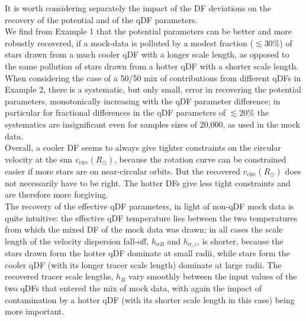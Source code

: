 It is worth considering separately the impact of the DF deviations on the recovery of the potential and of the qDF parameters. 
\\We find from Example 1 that the potential parameters can be better and more robustly recovered, if a mock-data \MAP is polluted by a modest fraction ($\lesssim 30\%$) of stars drawn from a much cooler qDF with a longer scale length, as opposed to the same pollution of stars drawn from a hotter qDF with a shorter scale length. 
\\When considering the case of a 50/50 mix of contributions from different qDFs in Example 2, there is a systematic, but only small, error in recovering the potential parameters, monotonically increasing with the qDF parameter difference; in particular for fractional differences in the qDF parameters of $\lesssim 20\%$ the systematics are insignificant even for samples sizes of 20,000, as used in the mock data. 
\\Overall, a cooler DF seems to always give tighter constraints on the circular velocity at the sun $v_\text{circ}(R_\odot)$, because the rotation curve can be constrained easier if more stars are on near-circular orbits. But the recovered $v_\text{circ}(R_\odot)$ does not necessarily have to be right. The hotter DFs give less tight constraints and are therefore more forgiving.
\\The recovery of the effective qDF parameters, in light of non-qDF mock data is quite intuitive: the effective qDF temperature lies between the two temperatures from which the mixed DF of the mock data was drawn; in all cases the scale length of the velocity dispersion fall-off, $h_{\sigma R}$ and $h_{\sigma , z}$, is shorter, because the stars drawn form the hotter qDF dominate at small radii, while stars form the cooler qDF (with its longer tracer scale length) dominate at large radii. The recovered tracer scale lengths, $h_R$ vary smoothly between the input values of the two qDFs that entered the mix of mock data, with again the impact of contamination by a hotter qDF (with its shorter scale length in this case) being more important. 





